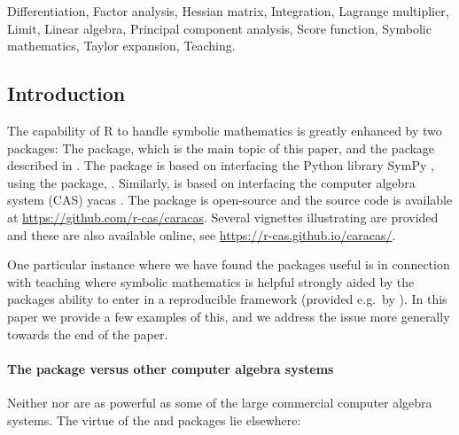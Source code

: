 Differentiation, Factor analysis, Hessian matrix, Integration, Lagrange
multiplier, Limit, Linear algebra, Principal component analysis, Score
function, Symbolic mathematics, Taylor expansion, Teaching.

\hypertarget{introduction}{%
\subsection{Introduction}\label{introduction}}

The capability of R \citep{R} to handle symbolic mathematics is greatly
enhanced by two packages: The  package, which is the
main topic of this paper, and the  package described in
\citet{ryacas}. The  package is based on interfacing
the Python library SymPy \citep{sympy}, using the 
package, \citep{reticulate}. Similarly,  is based on
interfacing the computer algebra system (CAS) yacas
\citep{yacas, Pinkus2002}. The  package is open-source
and the source code is available at
\url{https://github.com/r-cas/caracas}. Several vignettes illustrating
 are provided and these are also available online, see
\url{https://r-cas.github.io/caracas/}.

One particular instance where we have found the packages useful is in
connection with teaching where symbolic mathematics is helpful strongly
aided by the packages ability to enter in a reproducible framework
(provided e.g.~by ). In this paper we provide a few
examples of this, and we address the issue more generally towards the
end of the paper.

\hypertarget{the-package-versus-other-computer-algebra-systems}{%
\paragraph{\texorpdfstring{The  package versus other
computer algebra
systems}{The  package versus other computer algebra systems}}\label{the-package-versus-other-computer-algebra-systems}}

Neither  nor  are as powerful as some
of the large commercial computer algebra systems. The virtue of the
 and  packages lie elsewhere:

